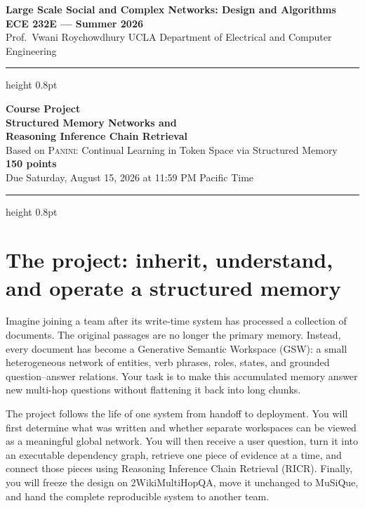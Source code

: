 \documentclass[11pt]{article}
\newcommand{\RICR}{{\mdseries\textsc{RICR}}\xspace}
\newcommand{\PANINI}{{\mdseries\textsc{Panini}}\xspace}
\begin{document}
\begin{center}
{\large\bfseries Large Scale Social and Complex Networks: Design and Algorithms}\\[2pt]
{\large\bfseries ECE 232E --- Summer 2026}\\[3pt]
Prof.\ Vwani Roychowdhury \hfill UCLA Department of Electrical and Computer Engineering
\end{center}
\vspace{2mm}
\hrule height 0.8pt
\vspace{4mm}
\begin{center}
  {\Huge\bfseries Course Project}\\[3pt]
  {\LARGE\bfseries Structured Memory Networks and}\\[2pt]
  {\LARGE\bfseries Reasoning Inference Chain Retrieval}\\[5pt]
  {\large Based on \PANINI: Continual Learning in Token Space via Structured Memory}\\[5pt]
  {\large\bfseries 150 points}\\[2pt]
  {\large Due Saturday, August 15, 2026 at 11:59 PM Pacific Time}
\end{center}
\vspace{4mm}
\hrule height 0.8pt
\vspace{5mm}

\section{The project: inherit, understand, and operate a structured memory}

Imagine joining a team after its write-time system has processed a collection
of documents. The original passages are no longer the primary memory.
Instead, every document has become a Generative Semantic Workspace (GSW): a
small heterogeneous network of entities, verb phrases, roles, states, and
grounded question--answer relations. Your task is to make this accumulated
memory answer new multi-hop questions without flattening it back into long
chunks.

The project follows the life of one system from handoff to deployment. You
will first determine what was written and whether separate workspaces can be
viewed as a meaningful global network. You will then receive a user question,
turn it into an executable dependency graph, retrieve one piece of evidence at
a time, and connect those pieces using Reasoning Inference Chain Retrieval
(\RICR). Finally, you will freeze the design on 2WikiMultiHopQA, move it
unchanged to MuSiQue, and hand the complete reproducible system to another
team.
\end{document}
